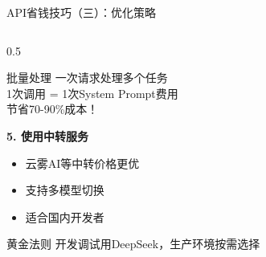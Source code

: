 \documentclass[aspectratio=169,11pt]{beamer}
\begin{document}
\begin{frame}{API省钱技巧（三）：优化策略}
\begin{columns}
\begin{column}{0.5\textwidth}
            \begin{exampleblock}{批量处理}
                \small
                一次请求处理多个任务\\
                1次调用 = 1次System Prompt费用\\
                \textcolor{green!60!black}{节省70-90\%成本！}
            \end{exampleblock}
            
            \vspace{0.2cm}
            \textbf{5. 使用中转服务}
            \begin{itemize}
                \item 云雾AI等中转价格更优
                \item 支持多模型切换
                \item 适合国内开发者
            \end{itemize}
            
            \vspace{0.2cm}
            \begin{alertblock}{黄金法则}
                \small
                开发调试用DeepSeek，生产环境按需选择
            \end{alertblock}
        \end{column}
    \end{columns}
\end{frame}
\end{document}

